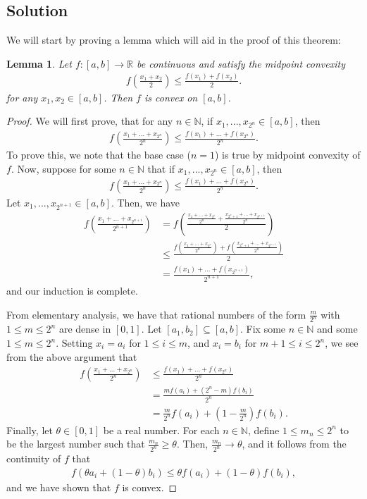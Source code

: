 \documentclass[10pt,a4paper]{article}
\theoremstyle{theorem}
\newtheorem{lemma}{Lemma}
\theoremstyle{definition}
\begin{document}
\subsection*{Solution}
We will start by proving a lemma which will aid in the proof of this theorem:
\begin{lemma}
Let $f:[a, b] \to \mathbb{R}$ be continuous and satisfy the midpoint convexity
\begin{align*}
f \left(\frac{x_1 + x_2}{2} \right) \leq \frac{f(x_1) + f(x_2)}{2}.
\end{align*}
for any $x_1, x_2 \in [a, b]$. Then $f$ is convex on $[a, b]$.
\end{lemma}
\begin{proof}
We will first prove, that for any $n \in \mathbb{N}$, if $x_1,...,x_{2^n} \in [a, b]$, then
\begin{align*}
f\left( \frac{x_1 + ... + x_{2^n}}{2^n} \right) \leq \frac{f(x_1) + ... + f(x_{2^n})}{2^n}.
\end{align*}
To prove this, we note that the base case ($n=1$) is true by midpoint convexity of $f$. Now, suppose for some $n \in \mathbb{N}$ that if $x_1,...,x_{2^n} \in [a, b]$, then
\begin{align*}
f\left( \frac{x_1 + ... + x_{2^n}}{2^n} \right) \leq \frac{f(x_1) + ... + f(x_{2^n})}{2^n}.
\end{align*}
Let $x_1,...,x_{2^{n+1}} \in [a, b]$. Then, we have
\begin{align*}
f\left( \frac{x_1 + ... + x_{2^{n+1}}}{2^{n+1}} \right) &= f\left( \frac{\frac{x_1 + ... + x_{2^n}}{2^n} + \frac{x_{2^n + 1} + ... + x_{2^{n+1}}}{2^n}}{2} \right)\\
&\leq \frac{f\left( \frac{x_1 + ... + x_{2^n}}{2^n}\right) + f \left( \frac{x_{2^n + 1} + ... + x_{2^{n+1}}}{2^n} \right)}{2}\\
&= \frac{f(x_1) + ... + f(x_{2^{n+1}})}{2^{n+1}},
\end{align*}
and our induction is complete.

From elementary analysis, we have that rational numbers of the form $\frac{m}{2^n}$ with $1 \leq m \leq 2^n$ are dense in $[0, 1]$. Let $[a_1, b_2] \subseteq [a, b]$. Fix some $n \in \mathbb{N}$ and some $1 \leq m \leq 2^n$. Setting $x_i = a_i$ for $1 \leq i \leq m$, and $x_i = b_i$ for $m+1 \leq i \leq 2^n$, we see from the above argument that
\begin{align*}
f\left( \frac{x_1 + ... + x_{2^n}}{2^n} \right) &\leq \frac{f(x_1) + ... + f(x_{2^n})}{2^n}\\
&= \frac{mf(a_i) + (2^n - m)f(b_i)}{2^n}\\
&= \frac{m}{2^n}f(a_i) + (1 - \frac{m}{2^n})f(b_i).
\end{align*}
Finally, let $\theta \in [0, 1]$ be a real number. For each $n \in \mathbb{N}$, define $1 \leq m_n \leq 2^n$ to be the largest number such that $\frac{m_n}{2^n} \geq \theta$. Then, $\frac{m_n}{2^n} \to \theta$, and it follows from the continuity of $f$ that 
\begin{align*}
f(\theta a_i + (1 - \theta)b_i) \leq \theta f(a_i) + (1 - \theta)f(b_i),
\end{align*}
and we have shown that $f$ is convex.
\end{proof}
\end{document}
